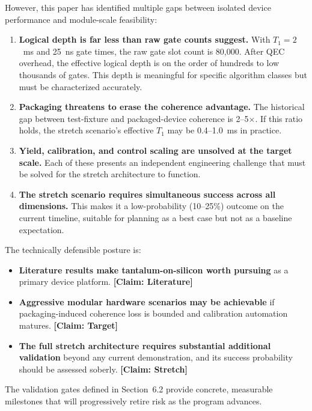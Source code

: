 \documentclass[conference]{IEEEtran}
\begin{document}
However, this paper has identified multiple gaps between isolated device performance and module-scale feasibility:

\begin{enumerate}
\item \textbf{Logical depth is far less than raw gate counts suggest.} With $T_1 = 2$~ms and 25~ns gate times, the raw gate slot count is 80,000. After QEC overhead, the effective logical depth is on the order of hundreds to low thousands of gates. This depth is meaningful for specific algorithm classes but must be characterized accurately.

\item \textbf{Packaging threatens to erase the coherence advantage.} The historical gap between test-fixture and packaged-device coherence is 2--5$\times$. If this ratio holds, the stretch scenario's effective $T_1$ may be 0.4--1.0~ms in practice.

\item \textbf{Yield, calibration, and control scaling are unsolved at the target scale.} Each of these presents an independent engineering challenge that must be solved for the stretch architecture to function.

\item \textbf{The stretch scenario requires simultaneous success across all dimensions.} This makes it a low-probability (10--25\%) outcome on the current timeline, suitable for planning as a best case but not as a baseline expectation.
\end{enumerate}

The technically defensible posture is:

\begin{itemize}
\item \textbf{Literature results make tantalum-on-silicon worth pursuing} as a primary device platform. \textbf{[Claim: Literature]}
\item \textbf{Aggressive modular hardware scenarios may be achievable} if packaging-induced coherence loss is bounded and calibration automation matures. \textbf{[Claim: Target]}
\item \textbf{The full stretch architecture requires substantial additional validation} beyond any current demonstration, and its success probability should be assessed soberly. \textbf{[Claim: Stretch]}
\end{itemize}

The validation gates defined in Section~6.2 provide concrete, measurable milestones that will progressively retire risk as the program advances.
\end{document}

